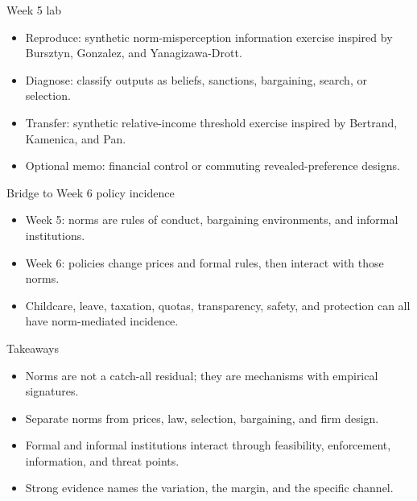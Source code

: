 \documentclass[aspectratio=169,11pt]{beamer}
\begin{document}
\begin{frame}{Week 5 lab}
\begin{itemize}
    \item Reproduce: synthetic norm-misperception information exercise inspired by Bursztyn, Gonzalez, and Yanagizawa-Drott.
    \item Diagnose: classify outputs as beliefs, sanctions, bargaining, search, or selection.
    \item Transfer: synthetic relative-income threshold exercise inspired by Bertrand, Kamenica, and Pan.
    \item Optional memo: financial control or commuting revealed-preference designs.
\end{itemize}
\end{frame}

\begin{frame}{Bridge to Week 6 policy incidence}
\begin{itemize}
    \item Week 5: norms are rules of conduct, bargaining environments, and informal institutions.
    \item Week 6: policies change prices and formal rules, then interact with those norms.
    \item Childcare, leave, taxation, quotas, transparency, safety, and protection can all have norm-mediated incidence.
\end{itemize}
\end{frame}

\begin{frame}{Takeaways}
\begin{itemize}
    \item Norms are not a catch-all residual; they are mechanisms with empirical signatures.
    \item Separate norms from prices, law, selection, bargaining, and firm design.
    \item Formal and informal institutions interact through feasibility, enforcement, information, and threat points.
    \item Strong evidence names the variation, the margin, and the specific channel.
\end{itemize}
\end{frame}
\end{document}
